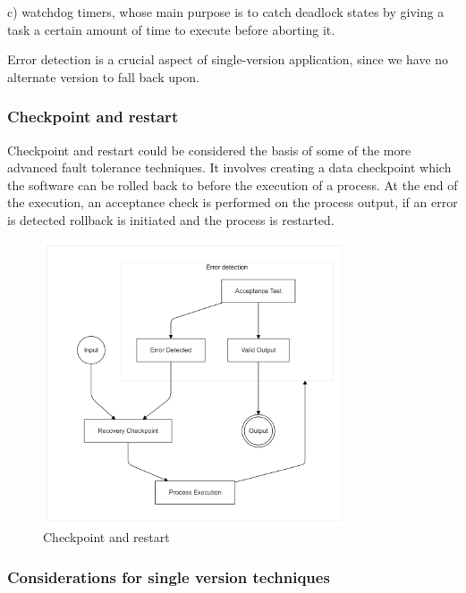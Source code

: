 c) watchdog timers, whose main purpose is to catch deadlock states by giving a task a certain amount of time to execute before aborting it.

Error detection is a crucial aspect of single-version application, since we have no alternate version to fall back upon.

\subsubsection{Checkpoint and restart}

Checkpoint and restart could be considered the basis of some of the more advanced fault tolerance techniques. It involves creating a data checkpoint which the software can be rolled back to before the execution of a process. At the end of the execution, an acceptance check is performed on the process output, if an error is detected rollback is initiated and the process is restarted.

\begin{figure}[hbt]
    \centering
    \includegraphics[width=0.8\textwidth]{diagrams/checkpoint/checkpoint.png}
    \caption{Checkpoint and restart}
    \label{fig:checkpoint}
\end{figure}

\subsubsection{Considerations for single version techniques}

